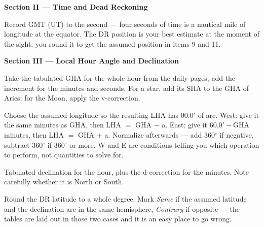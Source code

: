 \documentclass[10pt]{article}
\newcommand{\dg}{\ensuremath{^\circ}}
\newcommand{\mn}{\ensuremath{'}}
\begin{document}
\textbf{Section II --- Time and Dead Reckoning}
\begin{description}[leftmargin=2.4em,style=nextline,itemsep=0.1ex,topsep=0.2ex,parsep=0pt]
\item[4--7. Date, DR position, time.] Record GMT (UT) to the second --- four seconds
  of time is a nautical mile of longitude at the equator. The DR position is your
  best estimate at the moment of the sight; you round it to get the assumed
  position in items 9 and 11.
\end{description}

\textbf{Section III --- Local Hour Angle and Declination}
\begin{description}[leftmargin=2.4em,style=nextline,itemsep=0.1ex,topsep=0.2ex,parsep=0pt]
\item[8. GHA.] Take the tabulated GHA for the whole hour from the daily pages, add
  the increment for the minutes and seconds. For a star, add its SHA to the GHA of
  Aries; for the Moon, apply the v-correction.
\item[9. LHA.] Choose the assumed longitude so the resulting LHA has $00.0\mn$ of
  arc. West: give it the same minutes as GHA, then LHA $=$ GHA $-$ a. East: give it
  $60.0\mn-$GHA minutes, then LHA $=$ GHA $+$ a. Normalize afterwards --- add
  $360\dg$ if negative, subtract $360\dg$ if $360\dg$ or more. W and E are
  conditions telling you which operation to perform, not quantities to solve for.
\item[10. Declination.] Tabulated declination for the hour, plus the d-correction
  for the minutes. Note carefully whether it is North or South.
\item[11. Assumed latitude.] Round the DR latitude to a whole degree. Mark
  \emph{Same} if the assumed latitude and the declination are in the same
  hemisphere, \emph{Contrary} if opposite --- the tables are laid out in those two
  cases and it is an easy place to go wrong.
\end{description}
\end{document}
